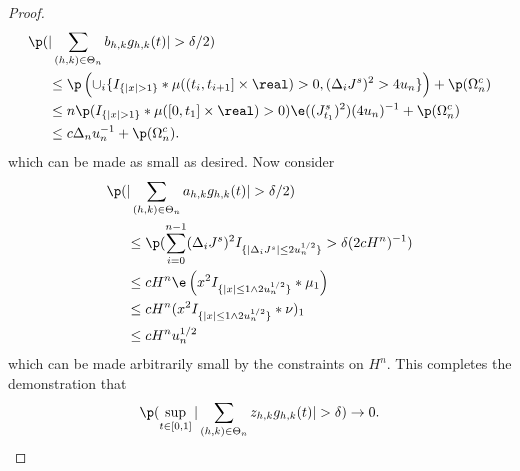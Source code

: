 \begin{proof}
\begin{align}
  \p(&\vert \sumt b_{h,k} \ghk(t) \vert > \delta/2) \notag \\ &\le
\p\left(\cup_i\{I_{\{\vert x \vert > 1\}}\ast \mu( (t_i, t_{i + 1}] \times \real) > 0   , (\djt)^2 > 4u_n\}\right)  + \p(\Omega_n^c)\notag \\
&\le n \p(I_{\{\vert x \vert > 1\}}\ast \mu( [0, t_1] \times \real) > 0) \e(( J^s_{t_1})^2)(4u_n)^{-1} + \p(\Omega_n^c)\notag \\
&\le c \Delta_n u^{-1}_n + \p(\Omega_n^c).
\end{align}
which can be made as small as desired. Now consider
\begin{align}
  \p(&\vert \sumt a_{h,k} \ghk(t) \vert > \delta/2) \notag \\ &\le \p( \sumin (\djt)^2 I_{\{\vert \djt \vert \le 2u_n^{1/2} \}} > \delta (2 c H^n)^{-1} )\notag\\
  &\le c H^n\e\left( x^2I_{\{\vert x\vert \le 1 \wedge 2 u_n^{1/2}\}}\ast\mu_1  \right)\notag \\
  &\le   c H^n (x^2I_{\{\vert x\vert \le 1 \wedge 2 u_n^{1/2}\}}\ast\nu)_1\notag \\
  &\le c H^n u^{1/2}_n \notag
\notag
\end{align}
which can be made arbitrarily small by the constraints on $H^n$. This completes the demonstration that  
\begin{align}
  \p(\sup_{t \in [0,1]}\vert \sumt z_{h,k} \ghk(t) \vert > \delta) \to 0.\label{eq:z}
\end{align}
\begin{comment}
Meanwhile, on $A_i \cap C_i$, it is easily seen that $\vert \djl \vert - \vert \dxc + \djt \vert < \vert \dx \vert \le u_n^{1/2}$, so that
\begin{align}
  \notag
  \dxf \djt I_{A_i \cap C_i} &\le \dxf \djt I_{\{\vert \djl \vert \le 4 u^{1/2}_n\}}\\
   &\le \dxc \djt I_{\{\vert \djl \vert \le 4 u^{1/2}_n\}} +  \djl \djt I_{\{\vert \djl \vert \le 4 u^{1/2}_n\}}\notag\\
   & =: \theta_i^1 + \theta_i^2\notag. 
  \label{}
\end{align}
Arguing as above, it is easily verified that $\e(\theta_i^1)  \le c \Delta_n^{5/4} u_n^{-1/8}$  so that 
\begin{align} 
  \p( \sup_{t \in \domain}\vert \sumt \sumin \btghki \theta^1_i \ghk(t)\vert > \eta) \le cH^n (u^{-1/2}_n\Delta_n)^{1/4} \notag \end{align}
Similarly,  $\e(\theta_i^2 I_{\Omega(n,q)}) \le q c \Delta_n u^{-1/4}_n$ so that  

\end{comment}
\end{proof}
